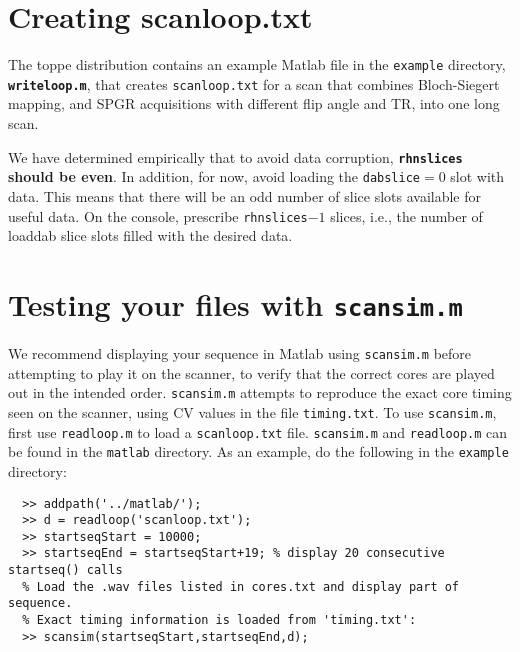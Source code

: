 \section{Creating scanloop.txt}
The toppe distribution contains an example Matlab file in the \texttt{example} directory, {\tt \bf writeloop.m}, that creates {\tt scanloop.txt} for a scan that combines Bloch-Siegert mapping, and SPGR acquisitions with different flip angle and TR, into one long scan. 

We have determined empirically that to avoid data corruption, {\bf{\tt rhnslices} should be even}.
In addition, for now, avoid loading the {\tt dabslice}$=0$ slot with data. 
This means that there will be an odd number of slice slots available for useful data.
On the console, prescribe {\tt rhnslices}$-1$ slices, i.e., the number of loaddab slice slots filled with the desired data.

\section{Testing your files with {\tt scansim.m} }

We recommend displaying your sequence in Matlab using \texttt{scansim.m} before attempting to play it on the scanner, to verify that the correct cores are played out in the intended order.
\texttt{scansim.m} attempts to reproduce the exact core timing seen on the scanner, using CV values in the file \texttt{timing.txt}.
To use \texttt{scansim.m}, first use \texttt{readloop.m} to load a \texttt{scanloop.txt} file.
\texttt{scansim.m} and \texttt{readloop.m} can be found in the \texttt{matlab} directory.
As an example, do the following in the \texttt{example} directory:
\begin{lstlisting}
  >> addpath('../matlab/');
  >> d = readloop('scanloop.txt');
  >> startseqStart = 10000;
  >> startseqEnd = startseqStart+19; % display 20 consecutive startseq() calls
  % Load the .wav files listed in cores.txt and display part of sequence.
  % Exact timing information is loaded from 'timing.txt':
  >> scansim(startseqStart,startseqEnd,d);  
\end{lstlisting}



